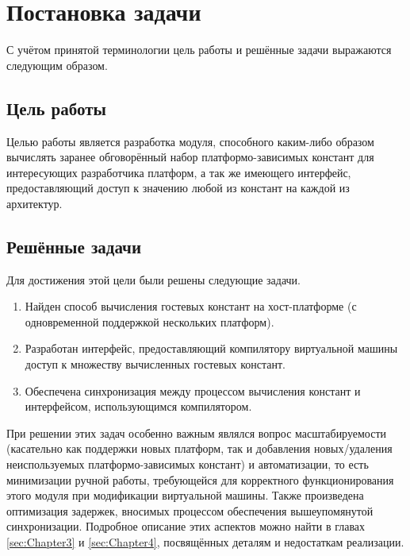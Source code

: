 \chapter{Постановка задачи}
\label{sec:Chapter1} 
С учётом принятой терминологии цель работы и решённые задачи выражаются следующим образом.
\section{Цель работы}
Целью работы является разработка модуля, способного каким-либо образом вычислять заранее обговорённый набор платформо-зависимых констант для интересующих разработчика платформ, а так же имеющего интерфейс, предоставляющий доступ к значению любой из констант на каждой из архитектур.
\par
\section{Решённые задачи}
Для достижения этой цели были решены следующие задачи.
\begin{enumerate}
    \item Найден способ вычисления гостевых констант на хост-платформе (с одновременной поддержкой нескольких платформ).
    \item Разработан интерфейс, предоставляющий компилятору виртуальной машины доступ к множеству вычисленных гостевых констант.
    \item Обеспечена синхронизация между процессом вычисления констант и интерфейсом, использующимся компилятором.
\end{enumerate}
При решении этих задач особенно важным являлся вопрос масштабируемости (касательно как поддержки новых платформ, так и добавления новых/удаления неиспользуемых платформо-зависимых констант) и автоматизации, то есть минимизации ручной работы, требующейся для корректного функционирования этого модуля при модификации виртуальной машины. 
Также произведена оптимизация задержек, вносимых процессом обеспечения вышеупомянутой синхронизации. Подробное описание этих аспектов можно найти в главах \ref{sec:Chapter3} и \ref{sec:Chapter4}, посвящённых деталям и недостаткам реализации.

\newpage
